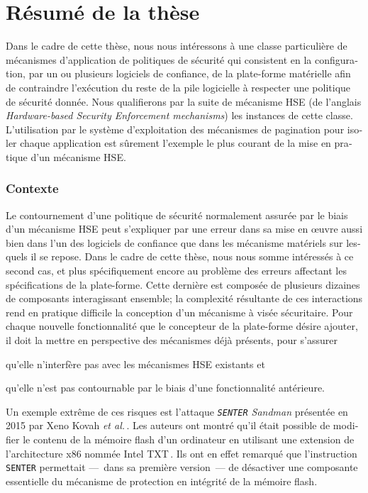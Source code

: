 \chapter{Résumé de la thèse}

\begin{otherlanguage}{french}
  Dans le cadre de cette thèse, nous nous intéressons à une classe particulière
  de mécanismes d’application de politiques de sécurité qui consistent en la
  configuration, par un ou plusieurs logiciels de confiance, de la plate-forme
  matérielle afin de contraindre l’exécution du reste de la pile logicielle à
  respecter une politique de sécurité donnée.
  Nous qualifierons par la suite de mécanisme HSE (de l’anglais
  \emph{Hardware-based Security Enforcement mechanisms}) les instances de cette
  classe.
  L’utilisation par le système d’exploitation des mécanismes de pagination pour
  isoler chaque application est sûrement l’exemple le plus courant de la mise en
  pratique d’un mécanisme HSE.

  \subsection{Contexte}

  Le contournement d’une politique de sécurité normalement assurée par le biais
  d’un mécanisme HSE peut s’expliquer par une erreur dans sa mise en œuvre aussi
  bien dans l’un des logiciels de confiance que dans les mécanisme matériels sur
  lesquels il se repose.
  Dans le cadre de cette thèse, nous nous somme intéressés à ce second cas, et
  plus spécifiquement encore au problème des erreurs affectant les
  spécifications de la plate-forme.
  Cette dernière est composée de plusieurs dizaines de composants interagissant
  ensemble; la complexité résultante de ces interactions rend en pratique
  difficile la conception d’un mécanisme à visée sécuritaire.
  Pour chaque nouvelle fonctionnalité que le concepteur de la plate-forme désire
  ajouter, il doit la mettre en perspective des mécanismes déjà présents, pour
  s’assurer
  \begin{inparaenum}[(1)]
  \item qu’elle n’interfère pas avec les mécanismes HSE existants et
  \item qu’elle n’est pas contournable par le biais d’une fonctionnalité
    antérieure.
  \end{inparaenum}
  Un exemple extrême de ces risques est l’attaque \emph{\texttt{SENTER} Sandman}
  présentée en 2015 par Xeno Kovah \emph{et al.}\,\cite{kovah2015senter}.
  Les auteurs ont montré qu’il était possible de modifier le contenu de la
  mémoire flash d’un ordinateur en utilisant une extension de l’architecture x86
  nommée Intel TXT\,\cite{intel2015txt}.
  Ils ont en effet remarqué que l’instruction \texttt{SENTER} permettait
  ---~dans sa première version~--- de désactiver une composante essentielle du
  mécanisme de protection en intégrité de la mémoire flash.


\end{otherlanguage}
